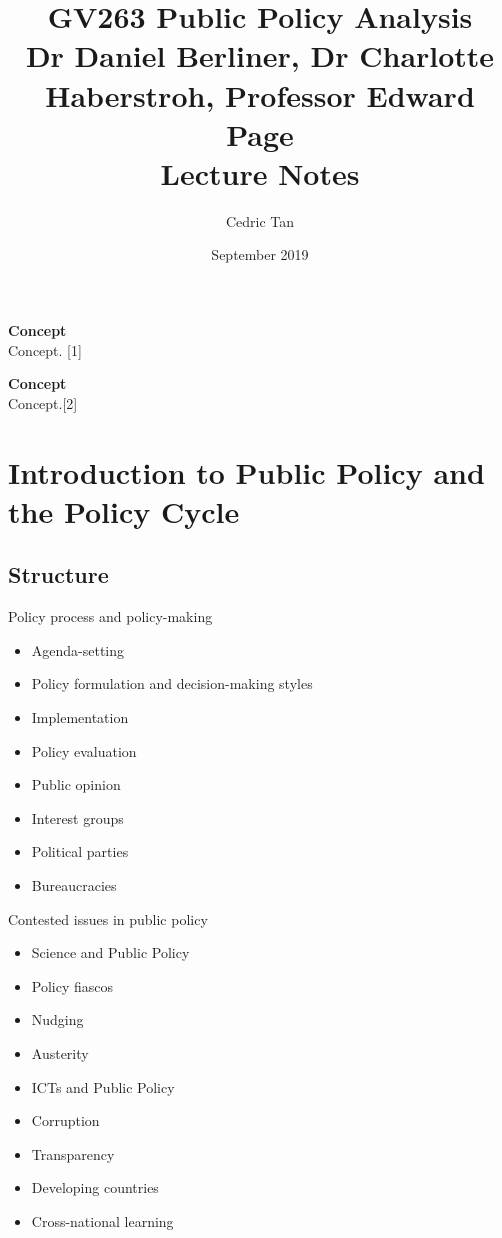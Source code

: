 \documentclass[12pt, letterpaper]{article}
\title{
	{GV263 Public Policy Analysis}\\
	{\large{Dr Daniel Berliner, Dr Charlotte Haberstroh, Professor Edward Page}}\\
	{\large{Lecture Notes}}
}
\author{Cedric Tan}
\date{September 2019}
\begin{document}
\maketitle
{\small
  \noindent\textbf{Concept}\\
  Concept. \hspace*{\fill}[1]

  \vspace{10pt}
  \noindent\textbf{Concept}\\
  Concept.\hspace*{\fill}[2]

\newpage
\tableofcontents
\newpage

\section{Introduction to Public Policy and the Policy Cycle}

\subsection{Structure}
Policy process and policy-making
\begin{itemize}
	\item Agenda-setting
	\item Policy formulation and decision-making styles
	\item Implementation
	\item Policy evaluation
	\item Public opinion
	\item Interest groups
	\item Political parties
	\item Bureaucracies
\end{itemize}
Contested issues in public policy
\begin{itemize}
	\item Science and Public Policy
	\item Policy fiascos
	\item Nudging
	\item Austerity
	\item ICTs and Public Policy
	\item Corruption
	\item Transparency
	\item Developing countries
	\item Cross-national learning
\end{itemize}

}
\end{document}

